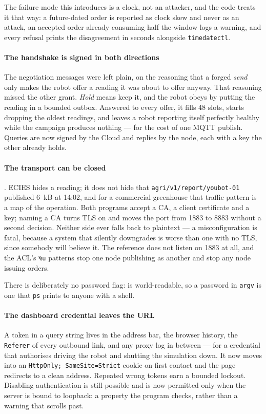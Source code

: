 The failure mode this introduces is a clock, not an attacker, and the
code treats it that way: a future-dated order is reported as clock skew
and never as an attack, an accepted order already consuming half the
window logs a warning, and every refusal prints the disagreement in
seconds alongside \texttt{timedatectl}.

\paragraph{The handshake is signed in both directions}
The negotiation messages were left plain, on the reasoning that a forged
\emph{send} only makes the robot offer a reading it was about to offer
anyway. That reasoning missed the other grant. \emph{Hold} means keep
it, and the robot obeys by putting the reading in a bounded outbox.
Answered to every offer, it fills 48 slots, starts dropping the oldest
readings, and leaves a robot reporting itself perfectly healthy while
the campaign produces nothing --- for the cost of one MQTT publish.
Queries are now signed by the Cloud and replies by the node, each with a
key the other already holds.

\paragraph{The transport can be closed}
. ECIES hides a reading; it does not hide that
\texttt{agri/v1/report/youbot-01} published \SI{6}{kB} at 14:02, and for
a commercial greenhouse that traffic pattern is a map of the operation.
Both programs accept a CA, a client certificate and a key; naming a CA
turns TLS on and moves the port from 1883 to 8883 without a second
decision. Neither side ever falls back to plaintext --- a
misconfiguration is fatal, because a system that silently downgrades is
worse than one with no TLS, since somebody will believe it. The
reference  does not listen on 1883 at all, and
the ACL's \texttt{\%u} patterns stop one node publishing as another and
stop any node issuing orders.

There is deliberately no password flag: 
is world-readable, so a password in \texttt{argv} is one that
\texttt{ps} prints to anyone with a shell.

\paragraph{The dashboard credential leaves the URL}
A token in a query string lives in the address bar, the browser history,
the \texttt{Referer} of every outbound link, and any proxy log in
between --- for a credential that authorises driving the robot and
shutting the simulation down. It now moves into an
\texttt{HttpOnly; SameSite=Strict} cookie on first contact and the page
redirects to a clean address. Repeated wrong tokens earn a bounded
lockout. Disabling authentication is still possible and is now permitted
only when the server is bound to loopback: a property the program
checks, rather than a warning that scrolls past.

